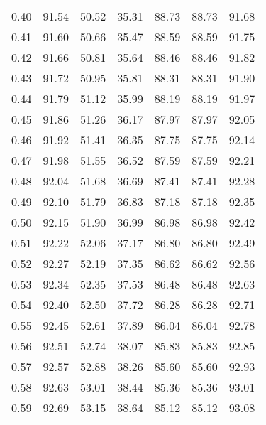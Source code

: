 \begin{tabular}{|c|c|c|c|c|c|c|}
      0.40 &     91.54 &     50.52 &      35.31 &   88.73 &      88.73 &         91.68 \\
      0.41 &     91.60 &     50.66 &      35.47 &   88.59 &      88.59 &         91.75 \\
      0.42 &     91.66 &     50.81 &      35.64 &   88.46 &      88.46 &         91.82 \\
      0.43 &     91.72 &     50.95 &      35.81 &   88.31 &      88.31 &         91.90 \\
      0.44 &     91.79 &     51.12 &      35.99 &   88.19 &      88.19 &         91.97 \\
      0.45 &     91.86 &     51.26 &      36.17 &   87.97 &      87.97 &         92.05 \\
      0.46 &     91.92 &     51.41 &      36.35 &   87.75 &      87.75 &         92.14 \\
      0.47 &     91.98 &     51.55 &      36.52 &   87.59 &      87.59 &         92.21 \\
      0.48 &     92.04 &     51.68 &      36.69 &   87.41 &      87.41 &         92.28 \\
      0.49 &     92.10 &     51.79 &      36.83 &   87.18 &      87.18 &         92.35 \\
      0.50 &     92.15 &     51.90 &      36.99 &   86.98 &      86.98 &         92.42 \\
      0.51 &     92.22 &     52.06 &      37.17 &   86.80 &      86.80 &         92.49 \\
      0.52 &     92.27 &     52.19 &      37.35 &   86.62 &      86.62 &         92.56 \\
      0.53 &     92.34 &     52.35 &      37.53 &   86.48 &      86.48 &         92.63 \\
      0.54 &     92.40 &     52.50 &      37.72 &   86.28 &      86.28 &         92.71 \\
      0.55 &     92.45 &     52.61 &      37.89 &   86.04 &      86.04 &         92.78 \\
      0.56 &     92.51 &     52.74 &      38.07 &   85.83 &      85.83 &         92.85 \\
      0.57 &     92.57 &     52.88 &      38.26 &   85.60 &      85.60 &         92.93 \\
      0.58 &     92.63 &     53.01 &      38.44 &   85.36 &      85.36 &         93.01 \\
      0.59 &     92.69 &     53.15 &      38.64 &   85.12 &      85.12 &         93.08 \\

\end{tabular}
